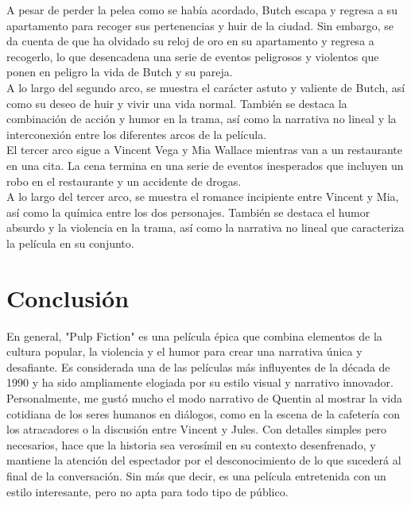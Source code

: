 \documentclass{article}
\begin{document}
A pesar de perder la pelea como se había acordado, Butch escapa y regresa a su apartamento para recoger sus pertenencias y huir de la ciudad. Sin embargo, se da cuenta de que ha olvidado su reloj de oro en su apartamento y regresa a recogerlo, lo que desencadena una serie de eventos peligrosos y violentos que ponen en peligro la vida de Butch y su pareja.\\

A lo largo del segundo arco, se muestra el carácter astuto y valiente de Butch, así como su deseo de huir y vivir una vida normal. También se destaca la combinación de acción y humor en la trama, así como la narrativa no lineal y la interconexión entre los diferentes arcos de la película.\\

El tercer arco sigue a Vincent Vega y Mia Wallace mientras van a un restaurante en una cita. La cena termina en una serie de eventos inesperados que incluyen un robo en el restaurante y un accidente de drogas.\\

A lo largo del tercer arco, se muestra el romance incipiente entre Vincent y Mia, así como la química entre los dos personajes. También se destaca el humor absurdo y la violencia en la trama, así como la narrativa no lineal que caracteriza la película en su conjunto.
\section*{Conclusión}

En general, "Pulp Fiction" es una película épica que combina elementos de la cultura popular, la violencia y el humor para crear una narrativa única y desafiante. Es considerada una de las películas más influyentes de la década de 1990 y ha sido ampliamente elogiada por su estilo visual y narrativo innovador.\\

Personalmente, me gustó mucho el modo narrativo de Quentin al mostrar la vida cotidiana de los seres humanos en diálogos, como en la escena de la cafetería con los atracadores o la discusión entre Vincent y Jules. Con detalles simples pero necesarios, hace que la historia sea verosímil en su contexto desenfrenado, y mantiene la atención del espectador por el desconocimiento de lo que sucederá al final de la conversación. Sin más que decir, es una película entretenida con un estilo interesante, pero no apta para todo tipo de público.
\end{document}
